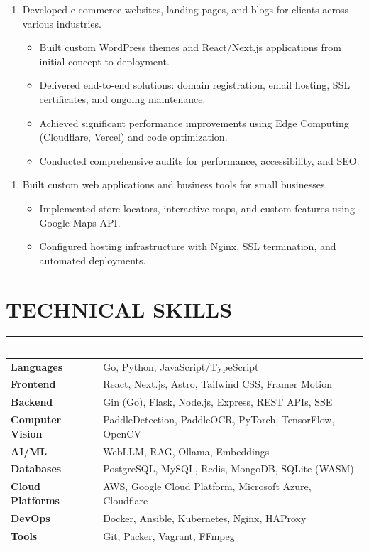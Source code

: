\documentclass{article}
\begin{document}
\begin{enumerate}
    \item[] Developed e-commerce websites, landing pages, and blogs for clients across various industries.
   \begin{itemize}
    \item Built custom WordPress themes and React/Next.js applications from initial concept to deployment.
    \item Delivered end-to-end solutions: domain registration, email hosting, SSL certificates, and ongoing maintenance.
    \item Achieved significant performance improvements using Edge Computing (Cloudflare, Vercel) and code optimization.
    \item Conducted comprehensive audits for performance, accessibility, and SEO.
   \end{itemize}
\end{enumerate}

\begin{enumerate}
    \item[] Built custom web applications and business tools for small businesses.
   \begin{itemize}
    \item Implemented store locators, interactive maps, and custom features using Google Maps API.
    \item Configured hosting infrastructure with Nginx, SSL termination, and automated deployments.
   \end{itemize}
\end{enumerate}




\section* {TECHNICAL SKILLS}
\hrule 
\subsection*{}
\begin{tabular}{ @{} >{\bfseries}l @{\hspace{5ex}} l }
Languages & Go, Python, JavaScript/TypeScript \\
Frontend & React, Next.js, Astro, Tailwind CSS, Framer Motion \\
Backend & Gin (Go), Flask, Node.js, Express, REST APIs, SSE \\
Computer Vision & PaddleDetection, PaddleOCR, PyTorch, TensorFlow, OpenCV \\
AI/ML & WebLLM, RAG, Ollama, Embeddings \\
Databases & PostgreSQL, MySQL, Redis, MongoDB, SQLite (WASM) \\
Cloud Platforms & AWS, Google Cloud Platform, Microsoft Azure, Cloudflare \\
DevOps & Docker, Ansible, Kubernetes, Nginx, HAProxy \\
Tools & Git, Packer, Vagrant, FFmpeg \\
\end{tabular}
   
\end{document}
